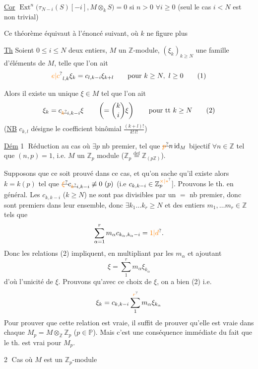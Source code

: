 \uline{Cor} $\operatorname{Ext}^n\bigl(\tau_{N-i}(S)[-i],M\otimes_k S\bigr)=0$ si $n>0$ $\forall i\geq0$ (seul le cas $i<N$ est non trivial)

Ce théorème équivaut à l'énoncé suivant, où $k$ ne figure plus

\uline{Th} Soient $0\leq i\leq N$ deux entiers, $M$ un $\mathbb{Z}$-module, $(\xi_k)_{k\geq N}$ une famille d'éléments de $M$, telle que l'on ait
\[
\unsure{e|c}_{l,k}\xi_k=c_{l,k-i}\xi_{k+l}\qquad\text{pour }k\geq N,\ l\geq0\tag*{(1)}
\]

Alors il existe un unique $\xi\in M$ tel que l'on ait
\[
\xi_k=c_{\deleted{\unsure{k}}i,k-i}\xi\qquad\left(=\binom{k}{i}\xi\right)\qquad\text{pour tt }k\geq N\tag*{(2)}
\]
(\uline{NB} $c_{k,l}$ désigne le coefficient binômial $\frac{(k+l)!}{k!\,l!}$)

\uline{Dém} \textcircled{1} Réduction au cas où $\exists p$ nb premier, tel que $\deleted{\unsure{p}}n\,\mathrm{id}_M$ bijectif $\forall n\in\mathbb Z$ tel que $(n,p)=1$, i.e. $M$ un $\mathbb Z_p$ module ($\mathbb Z_p\overset{\mathrm{def}}{=}\mathbb Z_{(p\mathbb Z)}$).

Supposons que ce soit prouvé dans ce cas, et qu'on sache qu'il existe alors $k=k(p)$ tel que $\deleted{\unsure{\xi}}c_{\deleted{\unsure{k}}i,k-i}\not\equiv0\ (p)$ (i.e $c_{k,k-i}\in\mathbb Z_p^{\unsure{\times|*}}$]. Prouvons le th. en général. Les $c_{k,k-i}$ ($k\geq N$) ne sont pas divisibles par un $=$ nb premier, donc sont premiers dans leur ensemble, donc $\exists k_1\ldots k_r\geq N$ et des entiers $m_1,\ldots m_r\in\mathbb Z$ tels que
\[
\sum_{\alpha=1}^{r}m_\alpha c_{k_\alpha,k_\alpha-i}=\unsure{1|d}.
\]
Donc les relations (2) impliquent, en multipliant par les $m_\alpha$ et ajoutant
\[
\xi=\sum_1^r m_\alpha\xi_{k_\alpha}
\]
d'où l'unicité de $\xi$. Prouvons qu'avec ce choix de $\xi$, on a bien (2) i.e.
\[
\xi_k=c_{k,k-i}\sum_1^{\unsure{r}} m_\alpha\xi_{k_\alpha}
\]
Pour prouver que cette relation est vraie,  il suffit de prouver qu'elle est vraie dans chaque $M_p=M\otimes_{\mathbb Z}\mathbb Z_p$ ($p\in\mathbb P$). Mais c'est une conséquence immédiate du fait que le th. est vrai pour $M_p$.

\textcircled{2} Cas où $M$ est un $\mathbb Z_p$-module

